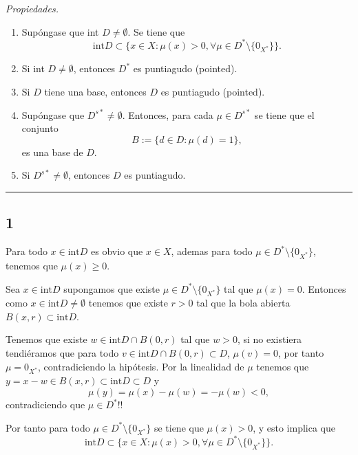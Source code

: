 \noindent \textit{Propiedades.}
\begin{enumerate}
    \item Supóngase que int $D \neq \emptyset$. Se tiene que
        \begin{equation*}
            \text{int} D \subset \{ x \in X : \mu(x) > 0, \forall \mu \in D^{*} \setminus \{ 0_{X^*} \} \}.
        \end{equation*}

    \item Si int $D \neq \emptyset$, entonces $D^{*}$ es puntiagudo (pointed).
    \item Si $D$ tiene una base, entonces $D$ es puntiagudo (pointed).
    \item Supóngase que $D^{s*} \neq \emptyset$.
        Entonces, para cada $\mu \in D^{s*}$ se tiene que el conjunto
        \begin{equation*}
            B := \{ d \in D : \mu(d) = 1 \},
        \end{equation*}
        es una base de $D$.
    \item Si $D^{s*} \neq \emptyset$, entonces $D$ es puntiagudo.
\end{enumerate}

\noindent\rule{10cm}{0.4pt}

\subsection*{1}

Para todo $x \in \text{int}D$ es obvio que $x \in X$,
ademas para todo $\mu \in D^* \setminus \{ 0_{X^*} \}$, tenemos que $\mu(x) \geq 0$.

Sea $x \in \text{int}D$ supongamos que existe $\mu \in D^* \setminus \{ 0_{X^*} \}$ tal que $\mu(x) = 0$.
Entonces como $x \in \text{int}D \neq \emptyset$ tenemos que existe $r > 0$ tal que la bola abierta $B(x, r) \subset \text{int} D$.

Tenemos que existe $w \in \text{int}D \cap B(0, r)$ tal que $w > 0$,
si no existiera tendiéramos que para todo $v \in \text{int}D \cap B(0, r) \subset D$, $\mu(v) = 0$,
por tanto $\mu = 0_{X^*}$, contradiciendo la hipótesis.
Por la linealidad de $\mu$ tenemos que $y = x - w \in B(x, r) \subset \text{int} D \subset D$ y
\begin{equation*}
    \mu(y) = \mu(x) - \mu(w) = - \mu(w) < 0,
\end{equation*} 
contradiciendo que $\mu \in D^*$!!

Por tanto para todo $\mu \in D^* \setminus \{ 0_{X^*} \}$ se tiene que $\mu(x) > 0$,
y esto implica que 
\begin{equation*}
    \text{int} D \subset \{ x \in X : \mu(x) > 0, \forall \mu \in D^{*} \setminus \{ 0_{X^*} \} \}.
\end{equation*}

